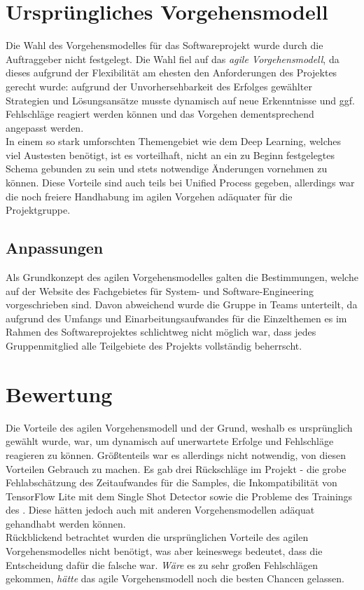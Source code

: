 \documentclass[12pt,a4paper,ngerman,enabledeprecatedfontcommands]{scrreprt}
\begin{document}
\section{Ursprüngliches Vorgehensmodell}
Die Wahl des Vorgehensmodelles für das Softwareprojekt wurde durch die Auftraggeber nicht festgelegt. Die Wahl fiel auf das \emph{agile Vorgehensmodell}, da dieses aufgrund der Flexibilität am ehesten den Anforderungen des Projektes gerecht wurde: aufgrund der Unvorhersehbarkeit des Erfolges gewählter Strategien und Lösungsansätze musste dynamisch auf neue Erkenntnisse und ggf. Fehlschläge reagiert werden können und das Vorgehen dementsprechend angepasst werden.\\
In einem so stark umforschten Themengebiet wie dem  \gls{Deep Learning}, welches viel Austesten benötigt, ist es vorteilhaft, nicht an ein zu Beginn festgelegtes Schema gebunden zu sein und stets notwendige Änderungen vornehmen zu können.
Diese Vorteile sind auch teils bei Unified Process gegeben, allerdings war die noch freiere Handhabung im agilen Vorgehen adäquater für die Projektgruppe.\\

\subsection{Anpassungen}
Als Grundkonzept des agilen Vorgehensmodelles galten die Bestimmungen, welche auf der Website des Fachgebietes für System- und Software-Engineering vorgeschrieben sind. Davon abweichend wurde die Gruppe in Teams unterteilt, da aufgrund des Umfangs und Einarbeitungsaufwandes für die Einzelthemen es im Rahmen des Softwareprojektes schlichtweg nicht möglich war, dass jedes Gruppenmitglied alle Teilgebiete des Projekts vollständig beherrscht.\\

\section{Bewertung}
Die Vorteile des agilen Vorgehensmodell und der Grund, weshalb es ursprünglich gewählt wurde, war, um dynamisch auf unerwartete Erfolge und Fehlschläge reagieren zu können. Größtenteils war es allerdings nicht notwendig, von diesen Vorteilen Gebrauch zu machen. Es gab drei Rückschläge im Projekt - die grobe Fehlabschätzung des Zeitaufwandes für die \gls{Sample}s, die Inkompatibilität von \gls{TensorFlow Lite} mit dem Single Shot Detector sowie die Probleme des Trainings des . Diese hätten jedoch auch mit anderen Vorgehensmodellen adäquat gehandhabt werden können.\\
Rückblickend betrachtet wurden die ursprünglichen Vorteile des agilen Vorgehensmodelles nicht benötigt, was aber keineswegs bedeutet, dass die Entscheidung dafür die falsche war. \emph{Wäre} es zu sehr großen Fehlschlägen gekommen, \emph{hätte} das agile Vorgehensmodell noch die besten Chancen gelassen.\\
\end{document}
